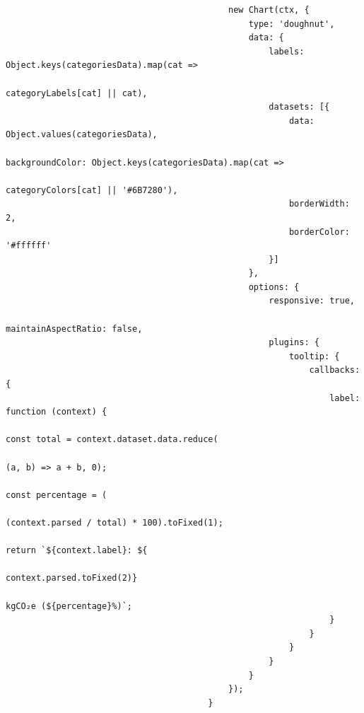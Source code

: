 \documentclass[a4paper,11pt]{article}
\begin{document}
\begin{enumerate}
\begin{itemize}
\begin{tcolorbox}[colback=lightgray!6, colframe=black, left=-75mm, right=5mm, top=2mm, bottom=0mm, boxrule=0.1mm]
\begin{verbatim}
                                            new Chart(ctx, {
                                                type: 'doughnut',
                                                data: {
                                                    labels: Object.keys(categoriesData).map(cat => 
                                                    categoryLabels[cat] || cat),
                                                    datasets: [{
                                                        data: Object.values(categoriesData),
                                                        backgroundColor: Object.keys(categoriesData).map(cat => 
                                                        categoryColors[cat] || '#6B7280'),
                                                        borderWidth: 2,
                                                        borderColor: '#ffffff'
                                                    }]
                                                },
                                                options: {
                                                    responsive: true,
                                                    maintainAspectRatio: false,
                                                    plugins: {
                                                        tooltip: {
                                                            callbacks: {
                                                                label: function (context) {
                                                                    const total = context.dataset.data.reduce(
                                                                        (a, b) => a + b, 0);
                                                                    const percentage = (
                                                                        (context.parsed / total) * 100).toFixed(1);
                                                                    return `${context.label}: ${
                                                                        context.parsed.toFixed(2)} 
                                                                        kgCO₂e (${percentage}%)`;
                                                                }
                                                            }
                                                        }
                                                    }
                                                }
                                            });
                                        }
                                    \end{verbatim}
                                \end{tcolorbox}
                        \end{itemize}


\end{enumerate}
\end{document}

